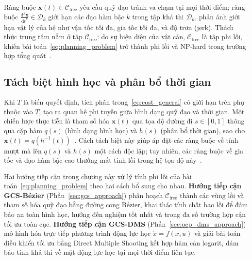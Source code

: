 Ràng buộc $\mathbf{x}(t) \in \mathcal{C}_{\mathrm{free}}$ yêu cầu quỹ đạo tránh
va chạm tại mọi thời điểm; ràng buộc $\frac{\mathrm{d}^k \mathbf{x}}{\mathrm{d}t^k}
\in \mathcal{D}_k$ giới hạn các đạo hàm bậc $k$ trong tập khả thi $\mathcal{D}_k$,
phản ánh giới hạn vật lý của hệ như vận tốc tối đa, gia tốc tối đa, và độ trơn (jerk).
Thách thức trung tâm nằm ở tập $\mathcal{C}_{\mathrm{free}}$: do sự hiện diện của
vật cản, $\mathcal{C}_{\mathrm{free}}$ là tập phi lồi, khiến bài
toán~\eqref{eq:planning_problem} trở thành phi lồi và NP-hard trong trường hợp
tổng quát~\cite{LaValle2006}.

\subsection{Tách biệt hình học và phân bổ thời gian}
\label{subsec:path_coord}

Khi $T$ là biến quyết định, tích phân trong~\eqref{eq:cost_general} có giới hạn trên
phụ thuộc vào $T$, tạo ra quan hệ phi tuyến giữa hình dạng quỹ đạo và thời gian.
Một chiến lược thực tiễn là tham số hóa $\mathbf{x}(t)$ qua tọa độ đường đi
$s \in [0,1]$ thông qua cặp hàm $q(s)$ (hình dạng hình học) và $h(s)$ (phân bổ thời
gian), sao cho $\mathbf{x}(t) = q(h^{-1}(t))$~\cite{BobrowDubowskyGibson1985TimeOptimal}.
Cách tách biệt này giúp áp đặt các ràng buộc về tính mượt mà lên $q(s)$ và $h(s)$
một cách độc lập; tuy nhiên, các ràng buộc về gia tốc và đạo hàm bậc cao thường mất
tính lồi trong hệ tọa độ này~\cite{MarcucciEtAl2023MotionPlanning}.

Hai hướng tiếp cận trong chương này xử lý tính phi lồi của
bài toán~\eqref{eq:planning_problem} theo hai cách bổ sung cho nhau.
\textbf{Hướng tiếp cận GCS-Bézier} (Phần~\ref{sec:gcs_approach}) phân hoạch
$\mathcal{C}_{\mathrm{free}}$ thành các vùng lồi và tham số hóa quỹ đạo bằng đường
cong Bézier, khai thác tính chất bao lồi để đảm bảo an toàn hình học, hướng đến
nghiệm tốt nhất và trong đa số trường hợp cận tối ưu toàn cục.
\textbf{Hướng tiếp cận GCS-DMS} (Phần~\ref{sec:ocp_dms_approach}) mô hình hóa
trực tiếp phương trình động lực học $\dot{x} = f(x, u)$ và giải bài toán điều khiển
tối ưu bằng Direct Multiple Shooting kết hợp hàm cản logarit, đảm bảo tính khả thi
về mặt động lực học tại mọi thời điểm liên tục.
